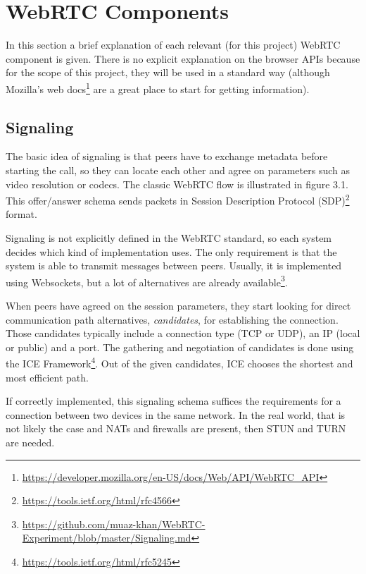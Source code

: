 \documentclass[paper=a4, fontsize=11pt]{scrartcl} %
\numberwithin{equation}{section} %
\numberwithin{figure}{section} %
\numberwithin{table}{section} %
\begin{document}
\section{WebRTC Components}

In this section a brief explanation of each relevant (for this project) WebRTC component is given. There is no explicit explanation on the browser APIs because for the scope of this project, they will be used in a standard way (although Mozilla's web docs\footnote{\url{https://developer.mozilla.org/en-US/docs/Web/API/WebRTC_API}} are a great place to start for getting information). 

\subsection{Signaling}

The basic idea of signaling is that peers have to exchange  metadata before starting the call, so they can locate each other and agree on parameters such as video resolution or codecs. The classic WebRTC flow is illustrated in figure 3.1. This offer/answer schema sends packets in Session Description Protocol (SDP)\footnote{\url{https://tools.ietf.org/html/rfc4566}} format.

Signaling is not explicitly defined in the WebRTC standard, so each system decides which kind of implementation uses. The only requirement is that the system is able to transmit messages between peers. Usually, it is implemented using Websockets, but a lot of alternatives are already available\footnote{\url{https://github.com/muaz-khan/WebRTC-Experiment/blob/master/Signaling.md}}.

When peers have agreed on the session parameters, they start looking for direct communication path alternatives, \textit{candidates}, for establishing the connection. Those candidates typically include a connection type (TCP or UDP), an IP (local or public) and a port. The gathering and negotiation of candidates is done using the ICE Framework\footnote{\url{https://tools.ietf.org/html/rfc5245}}. Out of the given candidates, ICE chooses the shortest and most efficient path.

If correctly implemented, this signaling schema suffices the requirements for a connection between two devices in the same network. In the real world, that is not likely the case and NATs and firewalls are present, then STUN and TURN are needed.
\end{document}
